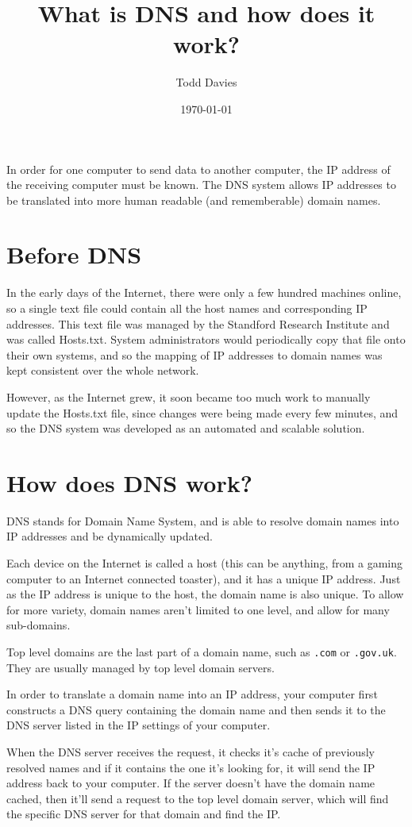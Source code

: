 \documentclass{article}
\author{Todd Davies}
\title{What is DNS and how does it work?}
\date{\today}
\begin{document}
\lhead{\today}

\maketitle

In order for one computer to send data to another computer, the IP address of
the receiving computer must be known. The DNS system allows IP addresses to be
translated into more human readable (and rememberable) domain names.

\section*{Before DNS}

In the early days of the Internet, there were only a few hundred machines
online, so a single text file could contain all the host names and corresponding
IP addresses. This text file was managed by the Standford Research Institute and
was called Hosts.txt. System administrators would periodically copy that file
onto their own systems, and so the mapping of IP addresses to domain names was
kept consistent over the whole network.

However, as the Internet grew, it soon became too much work to manually update
the Hosts.txt file, since changes were being made every few minutes, and so the
DNS system was developed as an automated and scalable solution.

\section*{How does DNS work?}

DNS stands for Domain Name System, and is able to resolve domain names into IP
addresses and be dynamically updated.

Each device on the Internet is called a host (this can be anything, from a
gaming computer to an Internet connected toaster), and it has a unique IP
address. Just as the IP address is unique to the host, the domain name is also
unique. To allow for more variety, domain names aren't limited to one level, and
allow for many sub-domains.

Top level domains are the last part of a domain name, such as \texttt{.com} or
\texttt{.gov.uk}. They are usually managed by top level domain servers.

In order to translate a domain name into an IP address, your computer first
constructs a DNS query containing the domain name and then sends it to the DNS
server listed in the IP settings of your computer.

When the DNS server receives the request, it checks it's cache of previously
resolved names and if it contains the one it's looking for, it will send the IP
address back to your computer. If the server doesn't have the domain name
cached, then it'll send a request to the top level domain server, which will
find the specific DNS server for that domain and find the IP.
\end{document}
